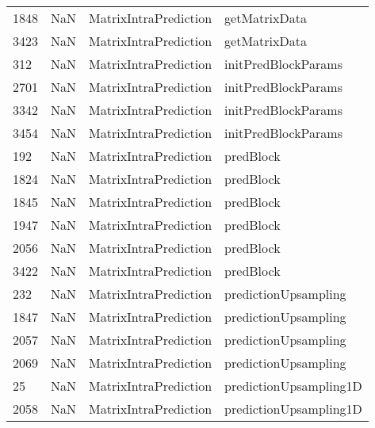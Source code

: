 \begin{tabular}{llll}
1848 &                   NaN &      MatrixIntraPrediction &                             getMatrixData \\
3423 &                   NaN &      MatrixIntraPrediction &                             getMatrixData \\
312  &                   NaN &      MatrixIntraPrediction &                       initPredBlockParams \\
2701 &                   NaN &      MatrixIntraPrediction &                       initPredBlockParams \\
3342 &                   NaN &      MatrixIntraPrediction &                       initPredBlockParams \\
3454 &                   NaN &      MatrixIntraPrediction &                       initPredBlockParams \\
192  &                   NaN &      MatrixIntraPrediction &                                 predBlock \\
1824 &                   NaN &      MatrixIntraPrediction &                                 predBlock \\
1845 &                   NaN &      MatrixIntraPrediction &                                 predBlock \\
1947 &                   NaN &      MatrixIntraPrediction &                                 predBlock \\
2056 &                   NaN &      MatrixIntraPrediction &                                 predBlock \\
3422 &                   NaN &      MatrixIntraPrediction &                                 predBlock \\
232  &                   NaN &      MatrixIntraPrediction &                      predictionUpsampling \\
1847 &                   NaN &      MatrixIntraPrediction &                      predictionUpsampling \\
2057 &                   NaN &      MatrixIntraPrediction &                      predictionUpsampling \\
2069 &                   NaN &      MatrixIntraPrediction &                      predictionUpsampling \\
25   &                   NaN &      MatrixIntraPrediction &                    predictionUpsampling1D \\
2058 &                   NaN &      MatrixIntraPrediction &                    predictionUpsampling1D \\

\end{tabular}
